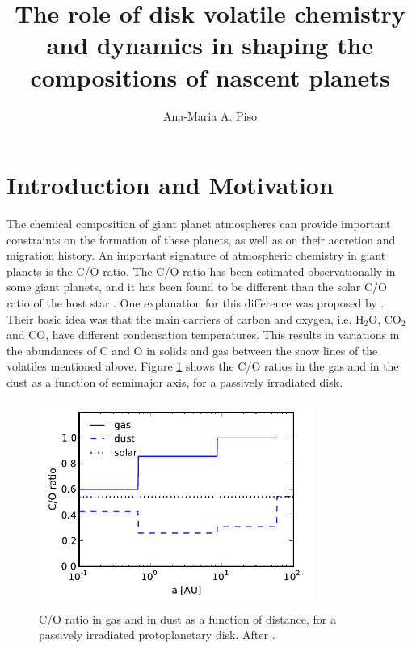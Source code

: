 \documentclass[manuscript]{aastex}
\begin{document}


\title{The role of disk volatile chemistry and dynamics in shaping the compositions of nascent planets}
\author{Ana-Maria A. Piso}

\section{Introduction and Motivation}

The chemical composition of giant planet atmospheres can provide important constraints on the formation of these planets, as well as on their accretion and migration history. An important signature of atmospheric chemistry in giant planets is the C/O ratio. The C/O ratio has been estimated observationally in some giant planets, and it has been found to be different than the solar C/O ratio of the host star \citep{madhu11}. One explanation for this difference was proposed by \citet{oberg11}. Their basic idea was that the main carriers of carbon and oxygen, i.e. H$_2$O, CO$_2$ and CO, have different condensation temperatures. This results in variations in the abundances of C and O in solids and gas between the snow lines of the volatiles mentioned above. Figure \ref{fig:CtoO} shows the C/O ratios in the gas and in the dust as a function of semimajor axis, for a passively irradiated disk. %



\begin{figure}[htb]
\centering
\includegraphics[width=0.8\textwidth]{../figs/C_O_ratio_2.pdf}
\caption{C/O ratio in gas and in dust as a function of distance, for a passively irradiated protoplanetary disk. After \citet{oberg11}.} %
\label{fig:CtoO}
\end{figure}
\end{document}
